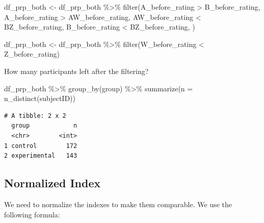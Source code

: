 \documentclass[
  letterpaper,
  DIV=11,
  numbers=noendperiod]{scrartcl}
\newenvironment{Shaded}{\begin{snugshade}}{\end{snugshade}}
\newcommand{\AttributeTok}[1]{\textcolor[rgb]{0.40,0.45,0.13}{#1}}
\newcommand{\FunctionTok}[1]{\textcolor[rgb]{0.28,0.35,0.67}{#1}}
\newcommand{\NormalTok}[1]{\textcolor[rgb]{0.00,0.23,0.31}{#1}}
\newcommand{\OtherTok}[1]{\textcolor[rgb]{0.00,0.23,0.31}{#1}}
\newcommand{\SpecialCharTok}[1]{\textcolor[rgb]{0.37,0.37,0.37}{#1}}
\begin{document}
\begin{Shaded}
\begin{Highlighting}[]
\NormalTok{df\_prp\_both }\OtherTok{\textless{}{-}}\NormalTok{ df\_prp\_both }\SpecialCharTok{\%\textgreater{}\%} \FunctionTok{filter}\NormalTok{(A\_before\_rating }\SpecialCharTok{\textgreater{}}\NormalTok{ B\_before\_rating, }
\NormalTok{                                      A\_before\_rating }\SpecialCharTok{\textgreater{}}\NormalTok{ AW\_before\_rating,}
\NormalTok{                                      AW\_before\_rating }\SpecialCharTok{\textless{}}\NormalTok{ BZ\_before\_rating, }
\NormalTok{                                      B\_before\_rating }\SpecialCharTok{\textless{}}\NormalTok{ BZ\_before\_rating,}
\NormalTok{                                      )}

\NormalTok{df\_prp\_both }\OtherTok{\textless{}{-}}\NormalTok{ df\_prp\_both }\SpecialCharTok{\%\textgreater{}\%} \FunctionTok{filter}\NormalTok{(W\_before\_rating }\SpecialCharTok{\textless{}}\NormalTok{ Z\_before\_rating)}
\end{Highlighting}
\end{Shaded}

How many participants left after the filtering?

\begin{Shaded}
\begin{Highlighting}[]
\NormalTok{df\_prp\_both }\SpecialCharTok{\%\textgreater{}\%}
  \FunctionTok{group\_by}\NormalTok{(group) }\SpecialCharTok{\%\textgreater{}\%}
  \FunctionTok{summarize}\NormalTok{(}\AttributeTok{n =} \FunctionTok{n\_distinct}\NormalTok{(subjectID))}
\end{Highlighting}
\end{Shaded}

\begin{verbatim}
# A tibble: 2 x 2
  group            n
  <chr>        <int>
1 control        172
2 experimental   143
\end{verbatim}

\subsection{Normalized Index}\label{normalized-index}

We need to normalize the indexes to make them comparable. We use the
following formula:
\end{document}
